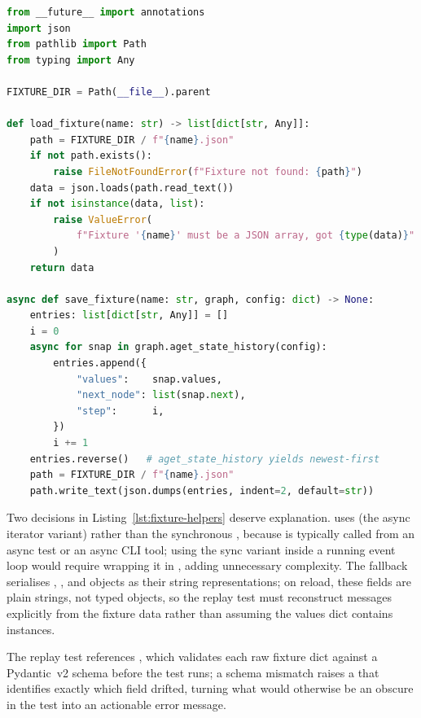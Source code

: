 \begin{lstlisting}[language=Python, caption={Fixture save and load
  helpers (\texttt{tests/fixtures/helpers.py}).},
  label={lst:fixture-helpers}]
from __future__ import annotations
import json
from pathlib import Path
from typing import Any

FIXTURE_DIR = Path(__file__).parent

def load_fixture(name: str) -> list[dict[str, Any]]:
    path = FIXTURE_DIR / f"{name}.json"
    if not path.exists():
        raise FileNotFoundError(f"Fixture not found: {path}")
    data = json.loads(path.read_text())
    if not isinstance(data, list):
        raise ValueError(
            f"Fixture '{name}' must be a JSON array, got {type(data)}"
        )
    return data

async def save_fixture(name: str, graph, config: dict) -> None:
    entries: list[dict[str, Any]] = []
    i = 0
    async for snap in graph.aget_state_history(config):
        entries.append({
            "values":    snap.values,
            "next_node": list(snap.next),
            "step":      i,
        })
        i += 1
    entries.reverse()   # aget_state_history yields newest-first
    path = FIXTURE_DIR / f"{name}.json"
    path.write_text(json.dumps(entries, indent=2, default=str))
\end{lstlisting}

Two decisions in Listing~\ref{lst:fixture-helpers} deserve explanation.
 uses  (the async
iterator variant) rather than the synchronous ,
because  is typically called from an async test or
an async CLI tool; using the sync variant inside a running event loop
would require wrapping it in , adding
unnecessary complexity.
The  fallback serialises
, , and  objects as their
string representations; on reload, these fields are plain strings, not
typed objects, so the replay test must reconstruct messages explicitly
from the fixture data rather than assuming the values dict contains
 instances.

The replay test references , which
validates each raw fixture dict against a Pydantic~v2 schema before the
test runs; a schema mismatch raises a  that
identifies exactly which field drifted, turning what would otherwise be
an obscure  in the test into an actionable error message.

